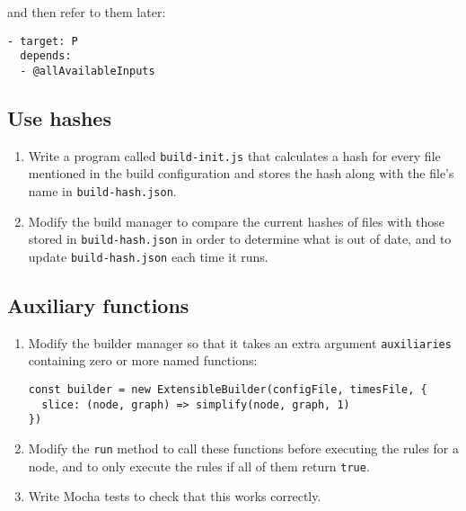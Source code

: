 \documentclass[krantzl]{krantz}
\begin{document}
\noindent and then refer to them later:

\begin{lstlisting}[frame=single,frameround=tttt]
- target: P
  depends:
  - @allAvailableInputs
\end{lstlisting}

\subsection*{Use hashes}

\begin{enumerate}

\item 

Write a program called \texttt{build-init.js} that calculates a hash
    for every file mentioned in the build configuration
    and stores the hash along with the file's name in \texttt{build-hash.json}.



\item 

Modify the build manager to compare the current hashes of files
    with those stored in \texttt{build-hash.json}
    in order to determine what is out of date,
    and to update \texttt{build-hash.json} each time it runs.



\end{enumerate}

\subsection*{Auxiliary functions}

\begin{enumerate}

\item 

Modify the builder manager so that it takes an extra argument \texttt{auxiliaries}
    containing zero or more named functions:

\begin{lstlisting}[frame=single,frameround=tttt]
const builder = new ExtensibleBuilder(configFile, timesFile, {
  slice: (node, graph) => simplify(node, graph, 1)
})
\end{lstlisting}



\item 

Modify the \texttt{run} method to call these functions
    before executing the rules for a node,
    and to only execute the rules if all of them return \texttt{true}.



\item 

Write Mocha tests to check that this works correctly.



\end{enumerate}
\end{document}
